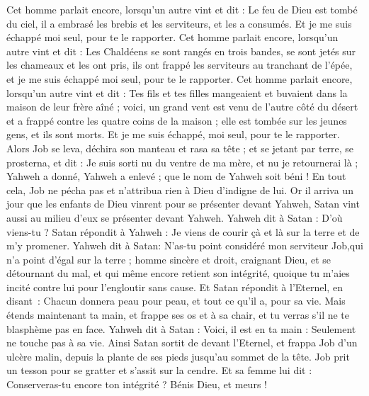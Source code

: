 \begin{multicols}{2}
Cet homme parlait encore, lorsqu'un autre vint et dit : Le feu de Dieu est tombé du ciel, il a embrasé les brebis et les serviteurs, et les a consumés. Et je me suis échappé moi seul, pour te le rapporter.
Cet homme parlait encore, lorsqu'un autre vint et dit : Les Chaldéens se sont rangés en trois bandes, se sont jetés sur les chameaux et les ont pris, ils ont frappé les serviteurs au tranchant de l'épée, et je me suis échappé moi seul, pour te le rapporter.
Cet homme parlait encore, lorsqu'un autre vint et dit : Tes fils et tes filles mangeaient et buvaient dans la maison de leur frère aîné ;
voici, un grand vent est venu de l'autre côté du désert et a frappé contre les quatre coins de la maison ; elle est tombée sur les jeunes gens, et ils sont morts. Et je me suis échappé, moi seul, pour te le rapporter.
Alors Job se leva, déchira son manteau et  rasa sa tête ; et se jetant par terre, se prosterna,
et dit : Je suis sorti nu du ventre de ma mère, et nu je retournerai là   ; Yahweh a donné, Yahweh a enlevé ; que le nom de Yahweh soit béni !
En tout cela, Job ne pécha pas et n'attribua rien à Dieu d'indigne de lui.
\VerseOne{}Or il arriva un jour que les enfants de Dieu vinrent pour se présenter devant Yahweh, Satan vint aussi au milieu d'eux se présenter devant Yahweh.
Yahweh dit à Satan : D'où viens-tu ? Satan répondit à Yahweh : Je viens de courir çà et là sur la terre et de m'y promener.
Yahweh dit à Satan: N'as-tu point considéré mon serviteur Job,qui n'a point d'égal sur la terre ; homme sincère et droit, craignant Dieu, et se détournant du mal, et qui même encore retient son intégrité, quoique tu m'aies incité contre lui pour l'engloutir sans cause.
Et Satan répondit à l’Eternel, en disant : Chacun donnera peau pour peau, et tout ce qu’il a, pour sa vie.
Mais étends maintenant ta main, et frappe ses os et à sa chair, et tu verras s'il ne te blasphème pas en face. 
Yahweh dit à Satan : Voici, il est en ta main : Seulement ne touche pas à sa vie.
Ainsi Satan sortit de devant l’Eternel, et frappa Job d’un ulcère malin, depuis la plante de ses pieds jusqu’au sommet de la tête.
Job prit un tesson pour se gratter et s'assit sur la cendre.
Et sa femme lui dit : Conserveras-tu encore ton intégrité ?  Bénis Dieu, et meurs !

\end{multicols}
